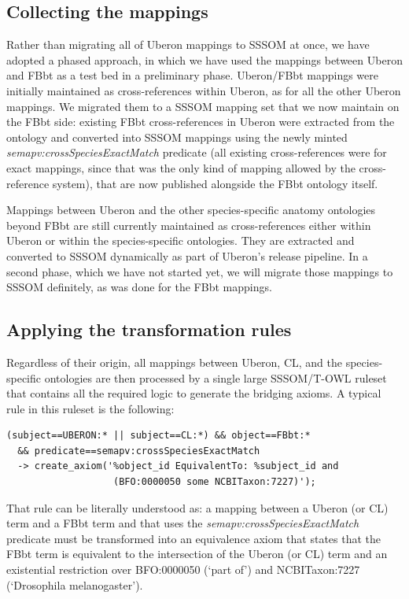 \documentclass{ceurart}
\def\term#1{`#1'}
\def\property#1{\textit{#1}}
\def\curie#1{\textsf{#1}}
\begin{document}
\subsection{Collecting the mappings}

Rather than migrating all of Uberon mappings to SSSOM at once, we have
adopted a phased approach, in which we have used the mappings between
Uberon and FBbt as a test bed in a preliminary phase. Uberon/FBbt
mappings were initially maintained as cross-references within Uberon, as
for all the other Uberon mappings. We migrated them to a SSSOM mapping
set that we now maintain on the FBbt side: existing FBbt
cross-references in Uberon were extracted from the ontology and
converted into SSSOM mappings using the newly minted
\property{semapv:crossSpeciesExactMatch} predicate (all existing
cross-references were for exact mappings, since that was the only kind
of mapping allowed by the cross-reference system), that are now
published alongside the FBbt ontology itself.

Mappings between Uberon and the other species-specific anatomy
ontologies beyond FBbt are still currently maintained as
cross-references either within Uberon or within the species-specific
ontologies. They are extracted and converted to SSSOM dynamically as
part of Uberon's release pipeline. In a second phase, which we have not
started yet, we will migrate those mappings to SSSOM definitely, as was
done for the FBbt mappings.

\subsection{Applying the transformation rules}

Regardless of their origin, all mappings between Uberon, CL, and the
species-specific ontologies are then processed by a single large
SSSOM/T-OWL ruleset that contains all the required logic to generate the
bridging axioms. A typical rule in this ruleset is the following:

\begin{lstlisting}
(subject==UBERON:* || subject==CL:*) && object==FBbt:*
  && predicate==semapv:crossSpeciesExactMatch
  -> create_axiom('%object_id EquivalentTo: %subject_id and
                   (BFO:0000050 some NCBITaxon:7227)');
\end{lstlisting}

That rule can be literally understood as: a mapping between a Uberon (or
CL) term and a FBbt term and that uses the
\property{semapv:crossSpeciesExactMatch} predicate must be transformed
into an equivalence axiom that states that the FBbt term is equivalent
to the intersection of the Uberon (or CL) term and an existential
restriction over \curie{BFO:0000050} (\term{part of}) and
\curie{NCBITaxon:7227} (\term{Drosophila melanogaster}).
\end{document}
